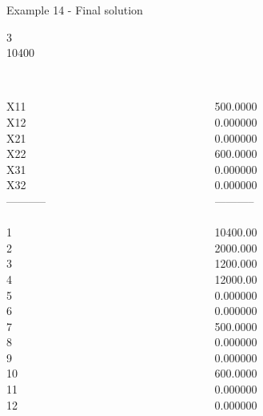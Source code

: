 \begin{frame}{Example 14 - Final solution}

  3\\
  10400\\

\begin{columns}[t]
\begin{column}{0.3\textwidth}
\\
X11\\
X12\\
X21\\
X22\\
X31\\
X32\\
-----------\\
\\
1\\
2\\
3\\
4\\
5\\
6\\
7\\
8\\
9\\
10\\
11\\
12\\

\end{column}
\begin{column}{0.3\textwidth}
\\
500.0000\\
0.000000\\
0.000000\\
600.0000\\
0.000000\\
0.000000\\

-----------\\
\\
10400.00\\
2000.000\\
1200.000\\
12000.00\\
0.000000\\
0.000000\\
500.0000\\
0.000000\\
0.000000\\
600.0000\\
0.000000\\
0.000000\\


\end{column}
\end{columns}
\end{frame}
